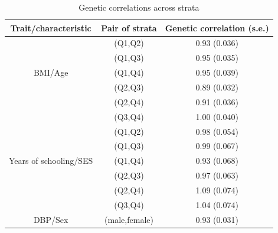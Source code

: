 \documentclass[hidelinks, 12pt]{article}
\begin{document}
\begin{table}[h!]
\caption{Genetic correlations across strata}
\begin{center}
 \begin{tabular}{|c | c | c |} 
 \hline
 \textbf{Trait/characteristic} & \textbf{Pair of strata} & \textbf{Genetic correlation (s.e.)} \\ [0.5ex] 
 \hline\hline
   & (Q1,Q2) & 0.93 (0.036)  \\ 
   & (Q1,Q3) & 0.95 (0.035)  \\ 
 BMI/Age & (Q1,Q4) & 0.95 (0.039)  \\ 
   & (Q2,Q3) & 0.89 (0.032)  \\ 
   & (Q2,Q4) & 0.91 (0.036)  \\ 
   & (Q3,Q4) & 1.00 (0.040)  \\ 
 \hline\hline
  & (Q1,Q2) & 0.98 (0.054)  \\ 
  & (Q1,Q3) & 0.99 (0.067)  \\ 
 Years of schooling/SES & (Q1,Q4) & 0.93 (0.068)  \\ 
  & (Q2,Q3) & 0.97 (0.063)  \\ 
  & (Q2,Q4) & 1.09 (0.074)  \\ 
  & (Q3,Q4) & 1.04 (0.074)  \\ 
 \hline\hline
 DBP/Sex & (male,female) & 0.93 (0.031)  \\ 
 \hline
 \end{tabular}
 \end{center}
\end{table}


%
%
\end{document}
